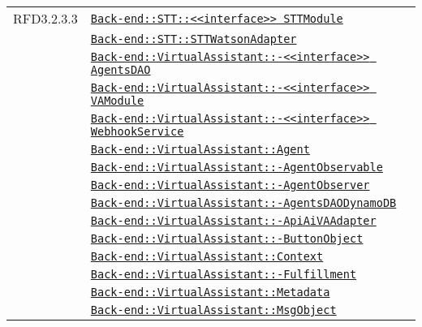 \begin{longtable}{|>{\centering}m{3cm}|m{10cm}<{\centering}|}
RFD3.2.3.3 & \hyperref[Back-end::STT::<<interface>> STTModule]{\texttt{Back-end::STT::<<interface>> STTModule}}\\
& \hyperref[Back-end::STT::STTWatsonAdapter]{\texttt{Back-end::STT::STTWatsonAdapter}}\\
& \hyperref[Back-end::VirtualAssistant::<<interface>> AgentsDAO]{\texttt{Back-end::VirtualAssistant::-\linebreak <<interface>> AgentsDAO}}\\
& \hyperref[Back-end::VirtualAssistant::<<interface>> VAModule]{\texttt{Back-end::VirtualAssistant::-\linebreak <<interface>> VAModule}}\\
& \hyperref[Back-end::VirtualAssistant::<<interface>> WebhookService]{\texttt{Back-end::VirtualAssistant::-\linebreak <<interface>> WebhookService}}\\
& \hyperref[Back-end::VirtualAssistant::Agent]{\texttt{Back-end::VirtualAssistant::Agent}}\\
& \hyperref[Back-end::VirtualAssistant::AgentObservable]{\texttt{Back-end::VirtualAssistant::-\linebreak AgentObservable}}\\
& \hyperref[Back-end::VirtualAssistant::AgentObserver]{\texttt{Back-end::VirtualAssistant::-\linebreak AgentObserver}}\\
& \hyperref[Back-end::VirtualAssistant::AgentsDAODynamoDB]{\texttt{Back-end::VirtualAssistant::-\linebreak AgentsDAODynamoDB}}\\
& \hyperref[Back-end::VirtualAssistant::ApiAiVAAdapter]{\texttt{Back-end::VirtualAssistant::-\linebreak ApiAiVAAdapter}}\\
& \hyperref[Back-end::VirtualAssistant::ButtonObject]{\texttt{Back-end::VirtualAssistant::-\linebreak ButtonObject}}\\
& \hyperref[Back-end::VirtualAssistant::Context]{\texttt{Back-end::VirtualAssistant::Context}}\\
& \hyperref[Back-end::VirtualAssistant::Fulfillment]{\texttt{Back-end::VirtualAssistant::-\linebreak Fulfillment}}\\
& \hyperref[Back-end::VirtualAssistant::Metadata]{\texttt{Back-end::VirtualAssistant::Metadata}}\\
& \hyperref[Back-end::VirtualAssistant::MsgObject]{\texttt{Back-end::VirtualAssistant::MsgObject}}\\

\end{longtable}
